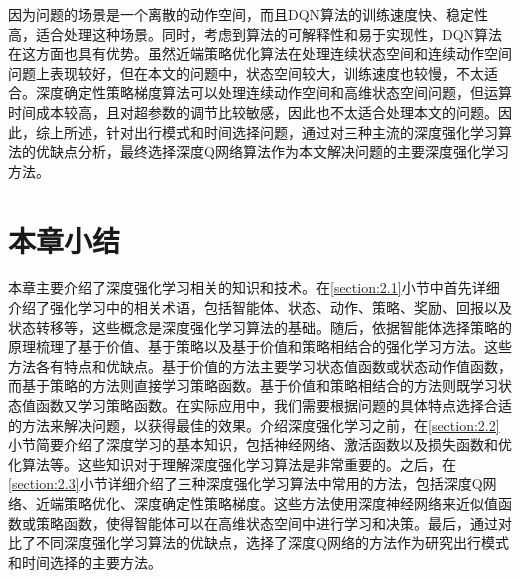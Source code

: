 因为问题的场景是一个离散的动作空间，而且DQN算法的训练速度快、稳定性高，适合处理这种场景。同时，考虑到算法的可解释性和易于实现性，DQN算法在这方面也具有优势。虽然近端策略优化算法在处理连续状态空间和连续动作空间问题上表现较好，但在本文的问题中，状态空间较大，训练速度也较慢，不太适合。深度确定性策略梯度算法可以处理连续动作空间和高维状态空间问题，但运算时间成本较高，且对超参数的调节比较敏感，因此也不太适合处理本文的问题。因此，综上所述，针对出行模式和时间选择问题，通过对三种主流的深度强化学习算法的优缺点分析，最终选择深度Q网络算法作为本文解决问题的主要深度强化学习方法。

\section{本章小结}

本章主要介绍了深度强化学习相关的知识和技术。在\ref{section:2.1}小节中首先详细介绍了强化学习中的相关术语，包括智能体、状态、动作、策略、奖励、回报以及状态转移等，这些概念是深度强化学习算法的基础。随后，依据智能体选择策略的原理梳理了基于价值、基于策略以及基于价值和策略相结合的强化学习方法。这些方法各有特点和优缺点。基于价值的方法主要学习状态值函数或状态动作值函数，而基于策略的方法则直接学习策略函数。基于价值和策略相结合的方法则既学习状态值函数又学习策略函数。在实际应用中，我们需要根据问题的具体特点选择合适的方法来解决问题，以获得最佳的效果。介绍深度强化学习之前，在\ref{section:2.2}小节简要介绍了深度学习的基本知识，包括神经网络、激活函数以及损失函数和优化算法等。这些知识对于理解深度强化学习算法是非常重要的。之后，在\ref{section:2.3}小节详细介绍了三种深度强化学习算法中常用的方法，包括深度Q网络、近端策略优化、深度确定性策略梯度。这些方法使用深度神经网络来近似值函数或策略函数，使得智能体可以在高维状态空间中进行学习和决策。最后，通过对比了不同深度强化学习算法的优缺点，选择了深度Q网络的方法作为研究出行模式和时间选择的主要方法。